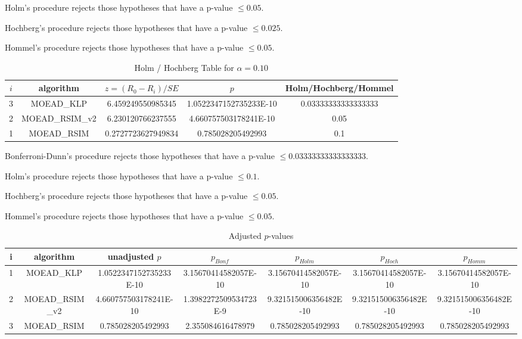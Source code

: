 \documentclass[a4paper,10pt]{article}
\begin{document}
\begin{landscape}
Holm's procedure rejects those hypotheses that have a p-value $\le0.05$.


Hochberg's procedure rejects those hypotheses that have a p-value $\le0.025$.


Hommel's procedure rejects those hypotheses that have a p-value $\le0.05$.


\begin{table}[!htp]
\centering\tiny
\caption{Holm / Hochberg Table for $\alpha=0.10$}
\begin{tabular}{ccccc}
$i$&algorithm&$z=(R_0 - R_i)/SE$&$p$&Holm/Hochberg/Hommel\\
\hline
3&MOEAD_KLP&6.459249550985345&1.0522347152735233E-10&0.03333333333333333\\
2&MOEAD_RSIM_v2&6.230120766237555&4.660757503178241E-10&0.05\\
1&MOEAD_RSIM&0.2727723627949834&0.785028205492993&0.1\\
\hline
\end{tabular}
\end{table}
Bonferroni-Dunn's procedure rejects those hypotheses that have a p-value $\le0.03333333333333333$.


Holm's procedure rejects those hypotheses that have a p-value $\le0.1$.


Hochberg's procedure rejects those hypotheses that have a p-value $\le0.05$.


Hommel's procedure rejects those hypotheses that have a p-value $\le0.05$.


\begin{table}[!htp]
\centering\tiny
\caption{Adjusted $p$-values}
\begin{tabular}{ccccccc}
i&algorithm&unadjusted $p$&$p_{Bonf}$&$p_{Holm}$&$p_{Hoch}$&$p_{Homm}$\\
\hline
1&MOEAD_KLP&1.0522347152735233E-10&3.15670414582057E-10&3.15670414582057E-10&3.15670414582057E-10&3.15670414582057E-10\\
2&MOEAD_RSIM_v2&4.660757503178241E-10&1.3982272509534723E-9&9.321515006356482E-10&9.321515006356482E-10&9.321515006356482E-10\\
3&MOEAD_RSIM&0.785028205492993&2.355084616478979&0.785028205492993&0.785028205492993&0.785028205492993\\
\hline
\end{tabular}
\end{table}


\end{landscape}
\end{document}

